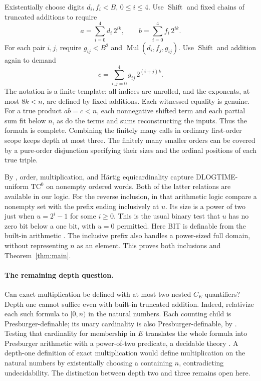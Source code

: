 \documentclass[11pt]{article}
\newcommand{\TC}{\mathrm{TC}^{0}}
\newcommand{\Mul}{\operatorname{Mul}}
\newcommand{\Sh}{\operatorname{Shift}}
\begin{document}
Existentially choose digits \(d_i,f_i<B\), \(0\leq i\leq4\).
Use \(\Sh\) and fixed chains of truncated additions to require
\[
 a=\sum_{i=0}^4 d_i\,2^{ik},\qquad b=\sum_{i=0}^4 f_i\,2^{ik}.
\]
For each pair \(i,j\), require \(g_{ij}<B^2\) and
\(\Mul(d_i,f_j,g_{ij})\). Use \(\Sh\) and addition again to demand
\[
 c=\sum_{i,j=0}^4 g_{ij}\,2^{(i+j)k}.
\]
The notation is a finite template: all indices are unrolled, and
the exponents, at most \(8k<n\), are defined by fixed additions.
Each witnessed equality is genuine. For a true product \(ab=c<n\),
each nonnegative shifted term and each partial sum fit below \(n\),
as do the terms and sums reconstructing the inputs. Thus the formula
is complete. Combining the finitely many calls in ordinary first-order
scope keeps depth at most three. The finitely many smaller orders
can be covered by a pure-order disjunction specifying their sizes
and the ordinal positions of each true triple.

By \cite[Section~2, especially equation~(5)]{hkl}, order,
multiplication, and H\"artig equicardinality capture DLOGTIME-uniform
\(\TC\) on nonempty ordered words. Both of the latter relations
are available in our logic. For the reverse inclusion, in that
arithmetic logic compare a nonempty set with the prefix ending
inclusively at \(u\). Its size is a power of two just when
\(u=2^i-1\) for some \(i\geq0\). This is the usual binary test
that \(u\) has no zero bit below a one bit, with \(u=0\) permitted.
Here BIT is definable from the built-in arithmetic
\cite[Chapter~6]{libkin}. The inclusive prefix also handles a
power-sized full domain, without representing \(n\) as an element.
This proves both inclusions and Theorem~\ref{thm:main}.

\paragraph{The remaining depth question.}
Can exact multiplication be defined with at most two nested
\(C_E\) quantifiers? Depth one cannot suffice even with built-in
truncated addition. Indeed, relativize each such formula to
\([0,n)\) in the natural numbers. Each counting child is
Presburger-definable; its unary cardinality is also
Presburger-definable, by \cite{schweikardt}. Testing that cardinality
for membership in \(E\) translates the whole formula into
Presburger arithmetic with a power-of-two predicate, a decidable
theory \cite{benedikt}. A depth-one definition of exact multiplication
would define multiplication on the natural numbers by existentially
choosing a containing \(n\), contradicting undecidability.
The distinction between depth two and three remains open here.
\end{document}

